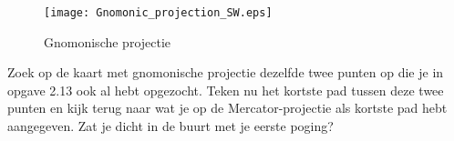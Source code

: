 \begin{figure}[h]
	\centering
	\texttt{[image: Gnomonic\_projection\_SW.eps]}
	\caption{Gnomonische projectie}
	\label{fig_gnomonic}
\end{figure}

\begin{opgave}
	Zoek op de kaart met gnomonische projectie dezelfde twee punten op die je in opgave 2.13 ook al hebt opgezocht. Teken nu het kortste pad tussen deze twee punten en kijk terug naar wat je op de Mercator-projectie als kortste pad hebt aangegeven. Zat je dicht in de buurt met je eerste poging?
\end{opgave}

\newpage